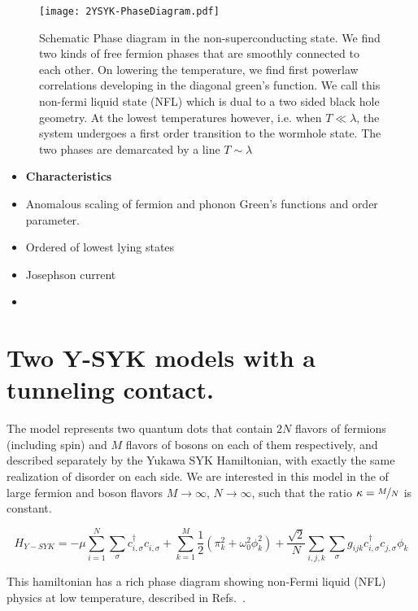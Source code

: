 \begin{figure}[t]
    \centering
    \texttt{[image: 2YSYK-PhaseDiagram.pdf]}
    \caption{
        Schematic Phase diagram in the non-superconducting state. We find two kinds of free fermion phases that are smoothly connected to each other. On lowering the temperature, we find first powerlaw correlations developing in the diagonal green's function. We call this non-fermi liquid state (NFL) which is dual to a two sided black hole geometry. At the lowest temperatures however, i.e. when $T \ll \lambda $, the system undergoes a first order transition to the wormhole state. The two phases are demarcated by a line $T \sim \lambda$}
    \label{fig:Schematic Phase diagram}
\end{figure}

\begin{itemize}
    \item {\bf Characteristics}
    \item Anomalous scaling of fermion and phonon Green's functions and order parameter.
    \item Ordered of lowest lying states
    \item Josephson current
    \item 
\end{itemize}






\section{Two Y-SYK models with a tunneling contact.}
\label{sec:model}

\noindent
The model represents two quantum dots that contain $2N$ flavors of fermions (including spin) and $M$ flavors of bosons on each of them respectively, and described separately by the Yukawa SYK Hamiltonian, with exactly the same realization of disorder on each side. We are interested in this model in the of large fermion and boson flavors $M\rightarrow\infty$, $N\rightarrow\infty$, such that the ratio $\kappa = \nicefrac{M}{N}$ is constant.
\begin{widetext}
\begin{equation}
    H_{Y-SYK} = -\mu\sum_{i=1}^N\sum_\sigma c^\dagger_{i,\sigma} c^{\phantom{\dagger}}_{i, \sigma} + \sum_{k=1}^M \frac{1}{2}\left(\pi_k^2 + \omega_0^2\phi_k^2\right) + \frac{\sqrt{2}}{N}\sum_{i,j,k}\sum_{\sigma}g_{ijk} c^\dagger_{i,\sigma} c^{\phantom{\dagger}}_{j,\sigma} \phi^{\phantom{\dagger}}_k
    \label{eq:HYSYK}
\end{equation}
\end{widetext}
This hamiltonian has a rich phase diagram showing non-Fermi liquid (NFL) physics at low temperature, described in Refs.~\cite{esterlis2019cooper,wang2020solvable,classen2021superconductivity}.

